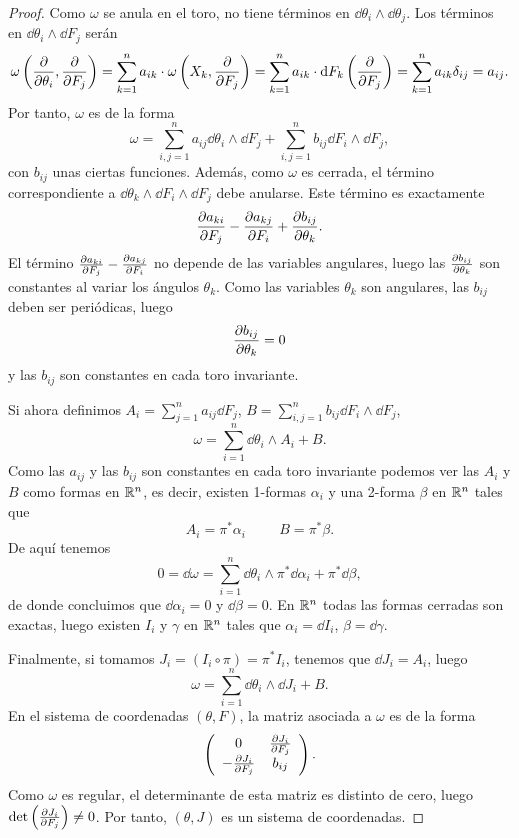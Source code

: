 \begin{proof}
Como $\omega$ se anula en el toro, no tiene términos en $\dd \theta_i \wedge \dd \theta_j$. Los términos en $\dd \theta_i \wedge \dd F_j$ serán
\[
  \omega\left(\frac{\partial}{\partial \theta_i},\frac{\partial}{\partial F_j}\right)=\sum_{k=1}^n a_{ik}\cdot \omega\left(X_k,\frac{\partial}{\partial F_j}\right)=\sum_{k=1}^n a_{ik} \cdot \mathrm{d} F_k \left(\frac{\partial}{\partial F_j}\right) = \sum_{k=1}^n a_{ik} \delta_{ij}= a_{ij}. 
\]
Por tanto, $\omega$ es de la forma
\[
  \omega = \sum_{i,j=1}^n a_{ij} \dd \theta_i \wedge \dd F_j + \sum_{i,j=1}^n b_{ij} \dd F_i \wedge \dd F_j,
\]
con $b_{ij}$ unas ciertas funciones. Además, como $\omega$ es cerrada, el término correspondiente a $\dd \theta_k \wedge \dd F_i \wedge \dd F_j$ debe anularse. Este término es exactamente
\[
  \frac{\partial a_{ki}}{\partial F_j}-\frac{\partial a_{kj}}{\partial F_i}+\frac{\partial b_{ij}}{\partial \theta_k}.
\]
El término $\frac{\partial a_{ki}}{\partial F_j}-\frac{\partial a_{kj}}{\partial F_i}$ no depende de las variables angulares, luego las $\frac{\partial b_{ij}}{\partial \theta_k}$ son constantes al variar los ángulos $\theta_k$. Como las variables $\theta_k$ son angulares, las $b_{ij}$ deben ser periódicas, luego
\[
  \frac{\partial b_{ij}}{\partial \theta_k}=0
\]
y las $b_{ij}$ son constantes en cada toro invariante.

Si ahora definimos $A_i=\sum_{j=1}^n a_{ij}\dd F_j$, $B=\sum_{i,j=1}^n b_{ij}\dd F_i \wedge \dd F_j$,
\[
  \omega=\sum_{i=1}^n \dd \theta_i \wedge A_i + B.
\]
Como las $a_{ij}$ y las $b_{ij}$ son constantes en cada toro invariante podemos ver las $A_i$ y $B$ como formas en $\mathbb{R}^n$, es decir, existen 1-formas $\alpha_i$ y una 2-forma $\beta$ en $\mathbb{R}^n$ tales que
\[
  A_i= \pi^* \alpha_i \hspace{1cm} B=\pi^* \beta.
\]
De aquí tenemos
\[
  0=\dd \omega= \sum_{i=1}^n \dd \theta_i \wedge \pi^* \dd \alpha_i + \pi^* \dd \beta,
\]
de donde concluimos que $\dd \alpha_i = 0$ y $\dd \beta =0$. En $\mathbb{R}^n$ todas las formas cerradas son exactas, luego existen $I_i$ y $\gamma$ en $\mathbb{R}^n$ tales que $\alpha_i = \dd I_i$, $\beta= \dd \gamma$.

Finalmente, si tomamos $J_i=(I_i \circ \pi)=\pi^* I_i$, tenemos que $\dd J_i = A_i$, luego
\[
  \omega = \sum_{i=1}^n \dd \theta_i \wedge \dd J_i + B.
\]
En el sistema de coordenadas $(\theta,F)$, la matriz asociada a $\omega$ es de la forma
\[
\left(
\begin{array}{cc}
  0 & \frac{\partial J_i}{\partial F_j} \\
  -\frac{\partial J_i}{\partial F_j} & b_{ij}
\end{array}\right).
\]
Como $\omega$ es regular, el determinante de esta matriz es distinto de cero, luego $\det\left(\frac{\partial J_i}{\partial F_j}\right)\neq 0$. Por tanto, $(\theta,J)$ es un sistema de coordenadas.


\end{proof}
